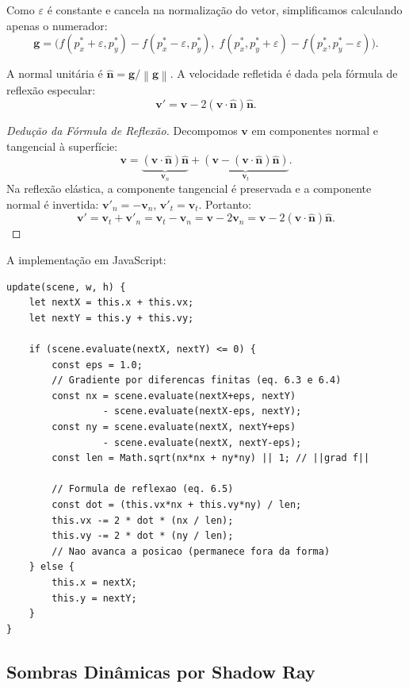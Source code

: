 \documentclass[11pt,a4paper]{article}
\theoremstyle{plain}
\theoremstyle{definition}
\newcommand{\vv}[1]{\mathbf{#1}}
\newcommand{\norm}[1]{\left\|#1\right\|}
\newcommand{\eps}{\varepsilon}
\begin{document}
Como $\eps$ é constante e cancela na normalização do vetor, simplificamos
calculando apenas o numerador:
\[
    \vv{g} = \bigl(f(p^*_x + \eps, p^*_y) - f(p^*_x - \eps, p^*_y),\;
                   f(p^*_x, p^*_y + \eps) - f(p^*_x, p^*_y - \eps)\bigr).
\]

A normal unitária é $\hat{\vv{n}} = \vv{g} / \norm{\vv{g}}$. A velocidade
refletida é dada pela fórmula de reflexão especular:
\begin{equation}
    \label{eq:reflexao}
    \vv{v}' = \vv{v} - 2 (\vv{v} \cdot \hat{\vv{n}}) \hat{\vv{n}}.
\end{equation}

\begin{proof}[Dedução da Fórmula de Reflexão]
Decompomos $\vv{v}$ em componentes normal e tangencial à superfície:
\[
    \vv{v} = \underbrace{(\vv{v} \cdot \hat{\vv{n}}) \hat{\vv{n}}}_{\vv{v}_n}
             + \underbrace{(\vv{v} - (\vv{v} \cdot \hat{\vv{n}})\hat{\vv{n}})}_{\vv{v}_t}.
\]
Na reflexão elástica, a componente tangencial é preservada e a componente normal
é invertida: $\vv{v}'_n = -\vv{v}_n$, $\vv{v}'_t = \vv{v}_t$. Portanto:
\[
    \vv{v}' = \vv{v}_t + \vv{v}'_n = \vv{v}_t - \vv{v}_n
            = \vv{v} - 2\vv{v}_n
            = \vv{v} - 2(\vv{v} \cdot \hat{\vv{n}})\hat{\vv{n}}.
\]
\end{proof}

A implementação em JavaScript:
\begin{lstlisting}
update(scene, w, h) {
    let nextX = this.x + this.vx;
    let nextY = this.y + this.vy;

    if (scene.evaluate(nextX, nextY) <= 0) {
        const eps = 1.0;
        // Gradiente por diferencas finitas (eq. 6.3 e 6.4)
        const nx = scene.evaluate(nextX+eps, nextY) 
                 - scene.evaluate(nextX-eps, nextY);
        const ny = scene.evaluate(nextX, nextY+eps) 
                 - scene.evaluate(nextX, nextY-eps);
        const len = Math.sqrt(nx*nx + ny*ny) || 1; // ||grad f||

        // Formula de reflexao (eq. 6.5)
        const dot = (this.vx*nx + this.vy*ny) / len;
        this.vx -= 2 * dot * (nx / len);
        this.vy -= 2 * dot * (ny / len);
        // Nao avanca a posicao (permanece fora da forma)
    } else {
        this.x = nextX;
        this.y = nextY;
    }
}
\end{lstlisting}

\subsection{Sombras Dinâmicas por Shadow Ray}
\label{subsec:shadowray}
\end{document}
